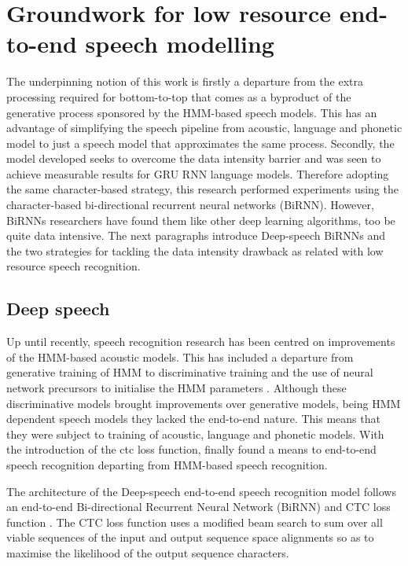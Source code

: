 \section{Groundwork for low resource end-to-end speech modelling}
The underpinning notion of this work is firstly a departure from the extra processing required for  bottom-to-top that comes as a byproduct of the generative process sponsored by the HMM-based speech models. This has an advantage of simplifying the speech pipeline from acoustic, language and phonetic model to just a speech model that approximates the same process.  Secondly, the model developed seeks to overcome the data intensity barrier and was seen to achieve measurable results for GRU RNN language models.  Therefore adopting the same character-based strategy, this research performed experiments using the character-based bi-directional recurrent neural networks (BiRNN).  However, BiRNNs researchers have found them like other deep learning algorithms, too be quite data intensive\cite{hannun2014deep}.  The next paragraphs introduce Deep-speech BiRNNs and the two strategies for tackling the data intensity drawback as related with low resource speech recognition.

\subsection{Deep speech}
Up until recently, speech recognition research has been centred on improvements of the HMM-based acoustic models.  This has included a departure from generative training of HMM to discriminative training \citep{woodland2000large} and the use of neural network precursors to initialise the HMM parameters \citep{mohamed2012acoustic}.  Although these  discriminative models brought improvements over generative models, being HMM dependent speech models they lacked the end-to-end nature.  This means that they were subject to training of acoustic, language and phonetic models.  With the introduction of the \acrfull{ctc} loss  function, \cite{graves2014towards} finally found a means to end-to-end speech recognition departing from HMM-based speech recognition. 

The architecture of the Deep-speech end-to-end speech recognition model \cite{hannun2014first} follows an end-to-end Bi-directional Recurrent Neural Network (BiRNN) and CTC loss function \citep{graves2006connectionist}.  The CTC loss function uses a modified beam search to sum over all viable sequences of the input and output sequence space alignments so as to maximise the likelihood of the output sequence characters.


